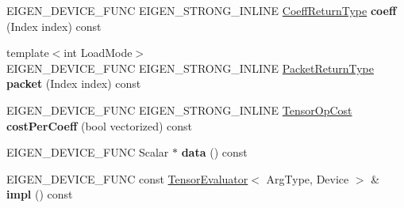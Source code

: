 \begin{DoxyCompactItemize}
E\+I\+G\+E\+N\+\_\+\+D\+E\+V\+I\+C\+E\+\_\+\+F\+U\+NC E\+I\+G\+E\+N\+\_\+\+S\+T\+R\+O\+N\+G\+\_\+\+I\+N\+L\+I\+NE \hyperlink{group___sparse_core___module}{Coeff\+Return\+Type} {\bfseries coeff} (Index index) const
\item 
\mbox{\label{struct_eigen_1_1_tensor_evaluator_3_01const_01_tensor_reshaping_op_3_01_new_dimensions_00_01_arg_type_01_4_00_01_device_01_4_aa5f85fd86458fd43c5fdae3e60ec5ba0}} 
{\footnotesize template$<$int Load\+Mode$>$ }\\E\+I\+G\+E\+N\+\_\+\+D\+E\+V\+I\+C\+E\+\_\+\+F\+U\+NC E\+I\+G\+E\+N\+\_\+\+S\+T\+R\+O\+N\+G\+\_\+\+I\+N\+L\+I\+NE \hyperlink{group___sparse_core___module}{Packet\+Return\+Type} {\bfseries packet} (Index index) const
\item 
\mbox{\label{struct_eigen_1_1_tensor_evaluator_3_01const_01_tensor_reshaping_op_3_01_new_dimensions_00_01_arg_type_01_4_00_01_device_01_4_af0a51aeb5eedd13e3ec93fd7b3465ec2}} 
E\+I\+G\+E\+N\+\_\+\+D\+E\+V\+I\+C\+E\+\_\+\+F\+U\+NC E\+I\+G\+E\+N\+\_\+\+S\+T\+R\+O\+N\+G\+\_\+\+I\+N\+L\+I\+NE \hyperlink{class_eigen_1_1_tensor_op_cost}{Tensor\+Op\+Cost} {\bfseries cost\+Per\+Coeff} (bool vectorized) const
\item 
\mbox{\label{struct_eigen_1_1_tensor_evaluator_3_01const_01_tensor_reshaping_op_3_01_new_dimensions_00_01_arg_type_01_4_00_01_device_01_4_ad67043073365e02c696ad4a09bea4bbf}} 
E\+I\+G\+E\+N\+\_\+\+D\+E\+V\+I\+C\+E\+\_\+\+F\+U\+NC Scalar $\ast$ {\bfseries data} () const
\item 
\mbox{\label{struct_eigen_1_1_tensor_evaluator_3_01const_01_tensor_reshaping_op_3_01_new_dimensions_00_01_arg_type_01_4_00_01_device_01_4_a7f06d2ba19cde3f66915d82e999ccf07}} 
E\+I\+G\+E\+N\+\_\+\+D\+E\+V\+I\+C\+E\+\_\+\+F\+U\+NC const \hyperlink{struct_eigen_1_1_tensor_evaluator}{Tensor\+Evaluator}$<$ Arg\+Type, Device $>$ \& {\bfseries impl} () const
\end{DoxyCompactItemize}
